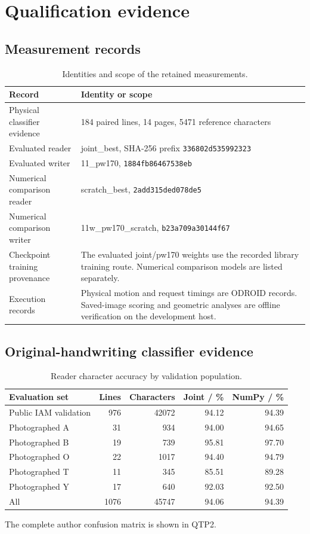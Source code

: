 \section{Qualification evidence}\label{app:res-evidence}
\subsection{Measurement records}\label{app:res-provenance}
\begin{table}[H]\centering\small
\begin{tabular}{p{.34\linewidth}p{.58\linewidth}}
\toprule Record & Identity or scope\\\midrule
Physical classifier evidence & 184 paired lines, 14 pages, 5471 reference characters\\
Evaluated reader & joint\_best, SHA-256 prefix \texttt{336802d535992323}\\
Evaluated writer & 11\_pw170, \texttt{1884fb86467538eb}\\
Numerical comparison reader & scratch\_best, \texttt{2add315ded078de5}\\
Numerical comparison writer & 11w\_pw170\_scratch, \texttt{b23a709a30144f67}\\
Checkpoint training provenance & The evaluated joint/pw170 weights use the recorded library training route. Numerical comparison models are listed separately.\\
Execution records & Physical motion and request timings are ODROID records. Saved-image scoring and geometric analyses are offline verification on the development host.\\
\bottomrule\end{tabular}
\caption{Identities and scope of the retained measurements.}\label{tab:app-checkpoints}\end{table}
\subsection{Original-handwriting classifier evidence}\label{app:res-validation}
\begin{table}[H]\centering\small
\begin{tabular}{lrrrr}\toprule
\textbf{Evaluation set} & \textbf{Lines} & \textbf{Characters} & \textbf{Joint / \%} & \textbf{NumPy / \%}\\\midrule
Public IAM validation & 976 & 42072 & 94.12 & 94.39\\
Photographed A & 31 & 934 & 94.00 & 94.65\\
Photographed B & 19 & 739 & 95.81 & 97.70\\
Photographed O & 22 & 1017 & 94.40 & 94.79\\
Photographed T & 11 & 345 & 85.51 & 89.28\\
Photographed Y & 17 & 640 & 92.03 & 92.50\\
All & 1076 & 45747 & 94.06 & 94.39\\
\bottomrule\end{tabular}
\caption{Reader character accuracy by validation population.}\label{tab:app-reader-breakdown}
\end{table}
The complete author confusion matrix is shown in QTP2.
